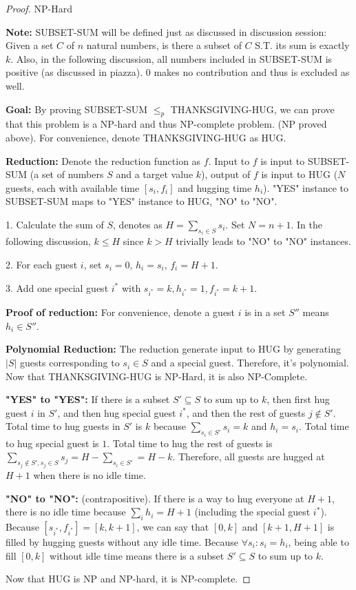 \documentclass[openany]{article}
\begin{document}
\begin{proof}{NP-Hard}

\textbf{Note:} SUBSET-SUM will be defined just as discussed in discussion session: Given a set $C$ of $n$ natural numbers, is there a subset of $C$ S.T. its sum is exactly $k$. Also, in the following discussion, all numbers included in SUBSET-SUM is positive (as discussed in piazza). 0 makes no contribution and thus is excluded as well.

\textbf{Goal:} By proving SUBSET-SUM $\leqslant_p$ THANKSGIVING-HUG, we can prove that this problem is a NP-hard and thus NP-complete problem. (NP proved above). For convenience, denote THANKSGIVING-HUG as HUG.

\textbf{Reduction:} Denote the reduction function as $f$. Input to $f$ is input to SUBSET-SUM (a set of numbers $S$ and a target value $k$), output of $f$ is input to HUG ($N$ guests, each with available time $[s_i, f_i]$ and hugging time $h_i$). "YES" instance to SUBSET-SUM maps to "YES" instance to HUG, "NO" to "NO". 

1. Calculate the sum of $S$, denotes as $H = \sum_{s_i\in S}s_i$. Set $N = n+1$. In the following discussion, $k \leqslant H$ since $k>H$ trivially leads to "NO" to "NO" instances.

2. For each guest $i$, set $s_i = 0$, $h_i=s_i$, $f_i = H+1$. 

3. Add one special guest $i^*$ with $s_{i^*} = k, h_{i^*} = 1, f_{i^*} = k+1$.


\textbf{Proof of reduction:} For convenience, denote a guest $i$ is in a set $S''$ means $h_i\in S''$.

\qquad \textbf{Polynomial Reduction:} The reduction generate input to HUG by generating $|S|$ guests corresponding to $s_i\in S$ and a special guest. Therefore, it's polynomial. Now that THANKSGIVING-HUG is NP-Hard, it is also NP-Complete.

\qquad \textbf{"YES" to "YES":} If there is a subset $S' \subseteq S$ to sum up to $k$, then first hug guest $i$ in $S'$, and then hug special guest $i^*$, and then the rest of guests $j  \not\in S'$. Total time to hug guests in $S'$ is $k$ because $\sum_{s_i\in S'}s_i = k $ and $h_i = s_i$. Total time to hug special guest is $1$. Total time to hug the rest of guests is $\sum_{s_j\notin S', s_j\in S} s_j = H-\sum_{s_i\in S'} = H-k$. Therefore, all guests are hugged at $H+1$ when there is no idle time.


\qquad \textbf{"NO" to "NO":} (contrapositive). If there is a way to hug everyone at $H+1$, there is no idle time because $\sum_i h_i = H+1$ (including the special guest $i^*$). Because $[s_{i^*},f_{i^*}] = [k, k+1]$, we can say that $[0,k]$ and $[k+1, H+1]$ is filled by hugging guests without any idle time. Because $\forall s_i: s_i=h_i$, being able to fill $[0,k]$ without idle time means there is a subset $S' \subseteq S$ to sum up to $k$.

Now that HUG is NP and NP-hard, it is NP-complete.


\end{proof}
\end{document}

